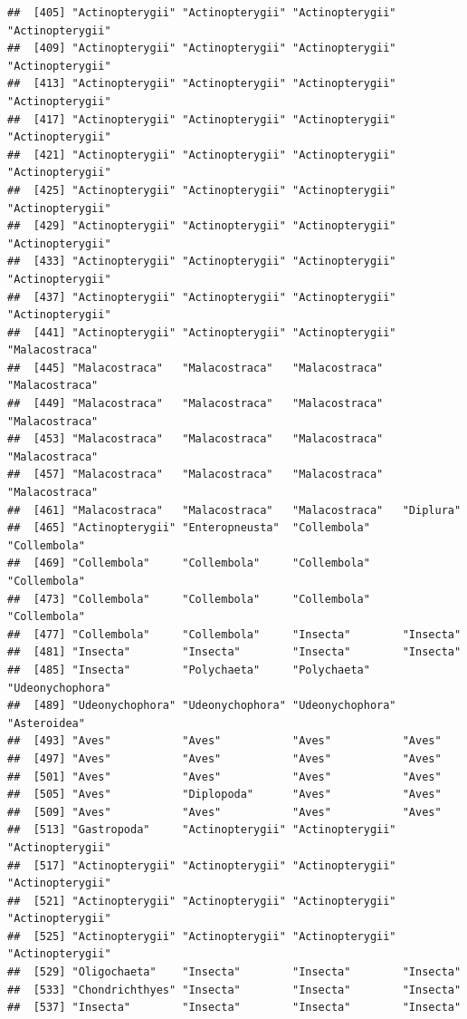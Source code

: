 \documentclass[
]{article}
\begin{document}
\begin{verbatim}
##  [405] "Actinopterygii" "Actinopterygii" "Actinopterygii" "Actinopterygii"
##  [409] "Actinopterygii" "Actinopterygii" "Actinopterygii" "Actinopterygii"
##  [413] "Actinopterygii" "Actinopterygii" "Actinopterygii" "Actinopterygii"
##  [417] "Actinopterygii" "Actinopterygii" "Actinopterygii" "Actinopterygii"
##  [421] "Actinopterygii" "Actinopterygii" "Actinopterygii" "Actinopterygii"
##  [425] "Actinopterygii" "Actinopterygii" "Actinopterygii" "Actinopterygii"
##  [429] "Actinopterygii" "Actinopterygii" "Actinopterygii" "Actinopterygii"
##  [433] "Actinopterygii" "Actinopterygii" "Actinopterygii" "Actinopterygii"
##  [437] "Actinopterygii" "Actinopterygii" "Actinopterygii" "Actinopterygii"
##  [441] "Actinopterygii" "Actinopterygii" "Actinopterygii" "Malacostraca"  
##  [445] "Malacostraca"   "Malacostraca"   "Malacostraca"   "Malacostraca"  
##  [449] "Malacostraca"   "Malacostraca"   "Malacostraca"   "Malacostraca"  
##  [453] "Malacostraca"   "Malacostraca"   "Malacostraca"   "Malacostraca"  
##  [457] "Malacostraca"   "Malacostraca"   "Malacostraca"   "Malacostraca"  
##  [461] "Malacostraca"   "Malacostraca"   "Malacostraca"   "Diplura"       
##  [465] "Actinopterygii" "Enteropneusta"  "Collembola"     "Collembola"    
##  [469] "Collembola"     "Collembola"     "Collembola"     "Collembola"    
##  [473] "Collembola"     "Collembola"     "Collembola"     "Collembola"    
##  [477] "Collembola"     "Collembola"     "Insecta"        "Insecta"       
##  [481] "Insecta"        "Insecta"        "Insecta"        "Insecta"       
##  [485] "Insecta"        "Polychaeta"     "Polychaeta"     "Udeonychophora"
##  [489] "Udeonychophora" "Udeonychophora" "Udeonychophora" "Asteroidea"    
##  [493] "Aves"           "Aves"           "Aves"           "Aves"          
##  [497] "Aves"           "Aves"           "Aves"           "Aves"          
##  [501] "Aves"           "Aves"           "Aves"           "Aves"          
##  [505] "Aves"           "Diplopoda"      "Aves"           "Aves"          
##  [509] "Aves"           "Aves"           "Aves"           "Aves"          
##  [513] "Gastropoda"     "Actinopterygii" "Actinopterygii" "Actinopterygii"
##  [517] "Actinopterygii" "Actinopterygii" "Actinopterygii" "Actinopterygii"
##  [521] "Actinopterygii" "Actinopterygii" "Actinopterygii" "Actinopterygii"
##  [525] "Actinopterygii" "Actinopterygii" "Actinopterygii" "Actinopterygii"
##  [529] "Oligochaeta"    "Insecta"        "Insecta"        "Insecta"       
##  [533] "Chondrichthyes" "Insecta"        "Insecta"        "Insecta"       
##  [537] "Insecta"        "Insecta"        "Insecta"        "Insecta"       

\end{verbatim}
\end{document}
